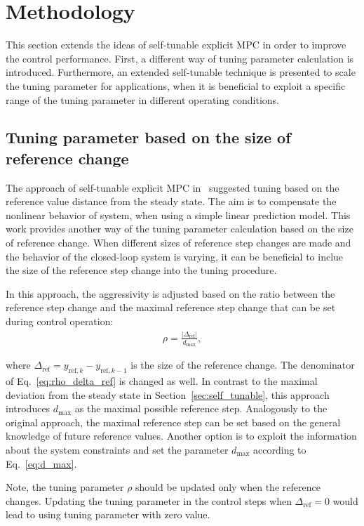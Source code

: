 \documentclass[preprint,12pt]{elsarticle}
\begin{document}
\section{Methodology}
\label{sec:methodology}
This section extends the ideas of self-tunable explicit MPC in order to improve the control performance. First, a different way of tuning parameter calculation is introduced. Furthermore, an extended self-tunable technique is presented to scale the tuning parameter for applications, when it is beneficial to exploit a specific range of the tuning parameter in different operating conditions. 


\subsection{Tuning parameter based on the size of reference change}
\label{sec:self_tunable_delta_ref}
The approach of self-tunable explicit MPC in~\cite{self_tunable} suggested tuning based on the reference value distance from the steady state. The aim is to compensate the nonlinear behavior of system, when using a simple linear prediction model. This work provides another way of the tuning parameter calculation based on the size of reference change. When different sizes of reference step changes are made and the behavior of the closed-loop system is varying, it can be beneficial to inclue the size of the reference step change into the tuning procedure.

In this approach, the aggressivity is adjusted based on the ratio between the reference step change and the maximal reference step change that can be set during control operation:
\begin{eqnarray}
	\label{eq:rho_delta_ref}
	\rho = \frac{\vert \Delta_{\mathrm{ref}} \vert}{d_{\max}},
\end{eqnarray} 

where $\Delta_{\mathrm{ref}} = y_{\mathrm{ref},k}-y_{\mathrm{ref},k-1}$ is the size of the reference change. The denominator of Eq.~\eqref{eq:rho_delta_ref} is changed as well. In contrast to the maximal deviation from the steady state in Section~\ref{sec:self_tunable}, this approach introduces $d_{\max}$ as the maximal possible reference step. 
Analogously to the original approach, the maximal reference step can be set based on the general knowledge of future reference values. Another option is to exploit the information about the system constraints and set the parameter $d_{\max}$ according to Eq.~\eqref{eq:d_max}.  

Note, the tuning parameter $\rho$ should be updated only when the reference changes. Updating the tuning parameter in the control steps when $\Delta_{\mathrm{ref}} = 0$ would lead to using tuning parameter with zero value.
\end{document}
